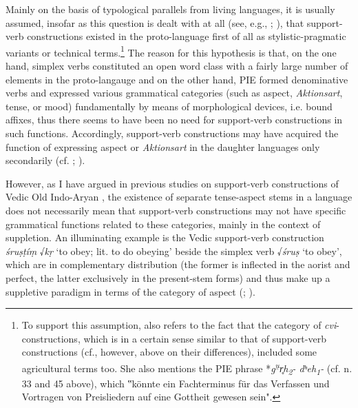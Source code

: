 \documentclass[output=paper,colorlinks,citecolor=brown]{langscibook}
\begin{document}
Mainly on the basis of typological parallels from living languages, it is usually assumed, insofar as this question is dealt with at all (see, e.g., \citealt[37]{Balles2006}; \citealt[79]{Schutzeichel2014}), that support-verb constructions existed in the proto-language first of all as stylistic-pragmatic variants or technical terms.\footnote{To support this assumption, \citet[38]{Balles2006} also refers to the fact that the category of \textit{cvi}-constructions, which is in a certain sense similar to that of support-verb constructions (cf., however, above on their differences), included some agricultural terms too. She also mentions the PIE phrase *\textit{g\textsuperscript{u̯}r̥h\textsubscript{2}- dʰeh\textsubscript{1}-} (cf. n. 33 and 45 above), which ‟könnte ein Fachterminus für das Verfassen und Vortragen von Preisliedern auf eine Gottheit gewesen sein".}       The reason for this hypothesis is that, on the one hand, simplex verbs constituted an open word class with a fairly large number of elements in the proto-langauge and on the other hand, PIE formed denominative verbs and expressed various grammatical categories (such as aspect, \textit{Aktionsart}, tense, or mood) fundamentally by means of morphological devices, i.e. bound affixes, thus there seems to have been no need for support-verb constructions in such functions. Accordingly, support-verb constructions may have acquired the function of expressing aspect or \textit{Aktionsart} in the daughter languages only secondarily (cf. \citealt[38 n. 85]{Balles2006}; \citealt[79]{Schutzeichel2014}).

However, as I have argued in previous studies on support-verb constructions of Vedic Old Indo-Aryan \citep{Ittzés2013,Ittzés2016}, the existence of separate tense-aspect stems in a language does not necessarily mean that support-verb constructions may not have specific grammatical functions related to these categories, mainly in the context of suppletion. An illuminating example is the Vedic support-verb construction \textit{śruṣṭíṃ} √\textit{kṛ} ‘to obey; lit. to do obeying’ beside the simplex verb √\textit{śruṣ} ‘to obey’, which are in complementary distribution (the former is inflected in the aorist and perfect, the latter exclusively in the present-stem forms) and thus make up a suppletive paradigm in terms of the category of aspect (\citealt[107--108]{Ittzés2013}; \citealt[61--65]{Ittzés2016}).
\end{document}
